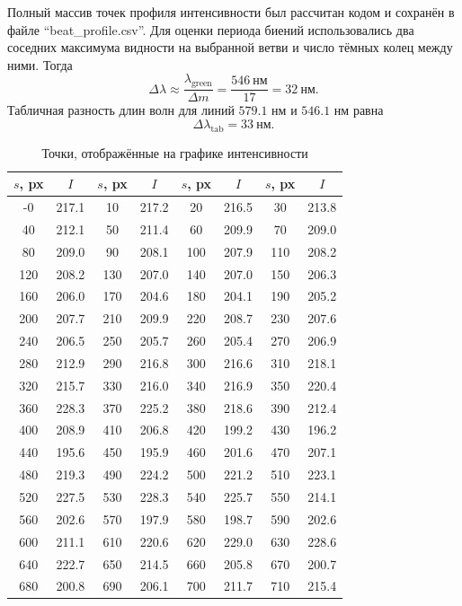 \documentclass[twoside]{mfitjournal}
\begin{document}
Полный массив точек профиля интенсивности был рассчитан кодом и сохранён в файле ``beat\_profile.csv''. Для оценки периода биений использовались два соседних максимума видности на выбранной ветви и число тёмных колец между ними. Тогда
\begin{equation}
\Delta \lambda \approx \frac{\lambda_{\text{green}}}{\Delta m}
= \frac{546\ \text{нм}}{17}
= 32\ \text{нм}.
\end{equation}
Табличная разность длин волн для линий $579.1$ нм и $546.1$ нм равна
\[
\Delta \lambda_{\text{tab}} = 33\ \text{нм}.
\]

\begin{table}[H]
\centering
\caption{Точки, отображённые на графике интенсивности}
\scriptsize
\begin{tabular}{cccccccc}
\toprule
$s$, px & $I$ & $s$, px & $I$ & $s$, px & $I$ & $s$, px & $I$ \\
\midrule
-0 & 217.1 & 10 & 217.2 & 20 & 216.5 & 30 & 213.8 \\
40 & 212.1 & 50 & 211.4 & 60 & 209.9 & 70 & 209.0 \\
80 & 209.0 & 90 & 208.1 & 100 & 207.9 & 110 & 208.2 \\
120 & 208.2 & 130 & 207.0 & 140 & 207.0 & 150 & 206.3 \\
160 & 206.0 & 170 & 204.6 & 180 & 204.1 & 190 & 205.2 \\
200 & 207.7 & 210 & 209.9 & 220 & 208.7 & 230 & 207.6 \\
240 & 206.5 & 250 & 205.7 & 260 & 205.4 & 270 & 206.9 \\
280 & 212.9 & 290 & 216.8 & 300 & 216.6 & 310 & 218.1 \\
320 & 215.7 & 330 & 216.0 & 340 & 216.9 & 350 & 220.4 \\
360 & 228.3 & 370 & 225.2 & 380 & 218.6 & 390 & 212.4 \\
400 & 208.9 & 410 & 206.8 & 420 & 199.2 & 430 & 196.2 \\
440 & 195.6 & 450 & 195.9 & 460 & 201.6 & 470 & 207.1 \\
480 & 219.3 & 490 & 224.2 & 500 & 221.2 & 510 & 223.1 \\
520 & 227.5 & 530 & 228.3 & 540 & 225.7 & 550 & 214.1 \\
560 & 202.6 & 570 & 197.9 & 580 & 198.7 & 590 & 202.6 \\
600 & 211.1 & 610 & 220.6 & 620 & 229.0 & 630 & 228.6 \\
640 & 222.7 & 650 & 214.5 & 660 & 205.8 & 670 & 200.7 \\
680 & 200.8 & 690 & 206.1 & 700 & 211.7 & 710 & 215.4 \\

\end{tabular}
\end{table}
\end{document}
